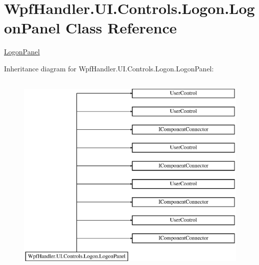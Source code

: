 \hypertarget{class_wpf_handler_1_1_u_i_1_1_controls_1_1_logon_1_1_logon_panel}{}\section{Wpf\+Handler.\+U\+I.\+Controls.\+Logon.\+Logon\+Panel Class Reference}
\label{class_wpf_handler_1_1_u_i_1_1_controls_1_1_logon_1_1_logon_panel}


\mbox{\hyperlink{class_wpf_handler_1_1_u_i_1_1_controls_1_1_logon_1_1_logon_panel}{Logon\+Panel}}  


Inheritance diagram for Wpf\+Handler.\+U\+I.\+Controls.\+Logon.\+Logon\+Panel\+:\begin{figure}[H]
\begin{center}
\leavevmode
\includegraphics[height=10.000000cm]{d2/d77/class_wpf_handler_1_1_u_i_1_1_controls_1_1_logon_1_1_logon_panel}
\end{center}
\end{figure}
